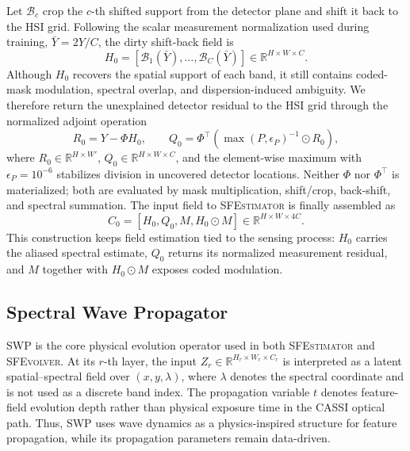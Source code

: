 \documentclass[letterpaper]{article} %
\newcommand{\sfestimator}{\textsc{SFEstimator}}
\newcommand{\sfevolver}{\textsc{SFEvolver}}
\newcommand{\swp}{\textsc{SWP}}
\begin{document}
Let \(\mathcal{B}_c\) crop the \(c\)-th shifted support from the detector plane and shift it back to the HSI grid.
Following the scalar measurement normalization used during training, \(\bar Y=2Y/C\), the dirty shift-back field is
\begin{equation}
H_0=\left[\mathcal{B}_1(\bar Y),\ldots,\mathcal{B}_C(\bar Y)\right]
\in\mathbb{R}^{H\times W\times C}.
\label{eq:h0}
\end{equation}
Although \(H_0\) recovers the spatial support of each band, it still contains coded-mask modulation, spectral overlap, and dispersion-induced ambiguity.
We therefore return the unexplained detector residual to the HSI grid through the normalized adjoint operation
\begin{equation}
R_0=Y-\Phi H_0,
\qquad
Q_0=\Phi^\top\left(\max(P,\epsilon_P)^{-1}\odot R_0\right),
\label{eq:q0}
\end{equation}
where \(R_0\in\mathbb{R}^{H\times W'}\), \(Q_0\in\mathbb{R}^{H\times W\times C}\), and the element-wise maximum with \(\epsilon_P=10^{-6}\) stabilizes division in uncovered detector locations.
Neither \(\Phi\) nor \(\Phi^\top\) is materialized; both are evaluated by mask multiplication, shift/crop, back-shift, and spectral summation.
The input field to \sfestimator{} is finally assembled as
\begin{equation}
C_0=[H_0,Q_0,M,H_0\odot M]
\in\mathbb{R}^{H\times W\times 4C}.
\label{eq:c0}
\end{equation}
This construction keeps field estimation tied to the sensing process: \(H_0\) carries the aliased spectral estimate, \(Q_0\) returns its normalized measurement residual, and \(M\) together with \(H_0\odot M\) exposes coded modulation.
\subsection{Spectral Wave Propagator}

\swp{} is the core physical evolution operator used in both \sfestimator{} and \sfevolver{}.
At its \(r\)-th layer, the input \(Z_r\in\mathbb{R}^{H_r\times W_r\times C_r}\) is interpreted as a latent spatial--spectral field over \((x,y,\lambda)\), where \(\lambda\) denotes the spectral coordinate and is not used as a discrete band index.
The propagation variable \(t\) denotes feature-field evolution depth rather than physical exposure time in the CASSI optical path.
Thus, \swp{} uses wave dynamics as a physics-inspired structure for feature propagation, while its propagation parameters remain data-driven.
\end{document}
